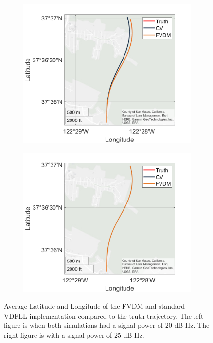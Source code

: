 \begin{figure}[!ht]
    \begin{subfigure}{.45\textwidth}
        \centering
        \includegraphics[width=1\linewidth]{Figures/dynamic/20/GEOPLOT.png}
    \end{subfigure}%
    \begin{subfigure}{.45\textwidth}
        \centering
        \includegraphics[width=1\linewidth]{Figures/dynamic/25/GEOPLOT.png}
    \end{subfigure}
    \caption{Average Latitude and Longitude of the FVDM and standard VDFLL implementation compared to the truth trajectory. The left figure is when both simulations had a signal power of \(20\) dB-Hz. The right figure is with a signal power of \(25\) dB-Hz.}\label{fig:GEOPLOT3}
\end{figure}

